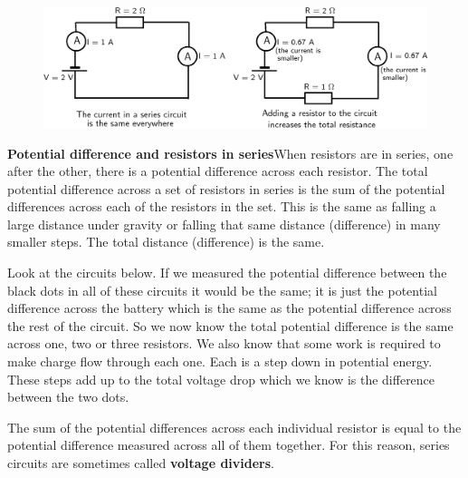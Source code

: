 	\begin{figure}[H] %
    \begin{center}
    \label{m38776*id67485!!!underscore!!!media}\label{m38776*id67485!!!underscore!!!printimage}\includegraphics{col11305.imgs/m38776_PG10C9_032.png} %
        
      \vspace{2pt}
    \vspace{.1in}
    
    \end{center}

 \end{figure}   

    \addtocounter{footnote}{-0}
    
          \par 


\label{m38776*id64070}\noindent{}\textbf{Potential difference and resistors in series}When resistors are in series, one after the other, there is a potential difference across each resistor. The total potential difference across a set of resistors in series is the sum of the potential differences across each of the resistors in the set. This is the same as falling a large distance under gravity or falling that same distance (difference) in many smaller steps. The total distance (difference) is the same.\par 
        \label{m38776*id64076}Look at the circuits below. If we measured the potential difference between the black dots in all of these circuits it would be the same; it is just the potential difference across the battery which is the same as the potential difference across the rest of the circuit. So we now know the total potential difference is the same across one, two or three resistors. We also know that some work is required to make charge flow through each one. Each is a step down in potential energy. These steps add up to the total voltage drop which we know is the difference between the two dots.

The sum of the potential differences across each individual resistor is equal to the potential difference measured across all of them together. For this reason, series circuits are sometimes called \textbf{voltage dividers}.\par 
        \label{m38776*id64084}
          
